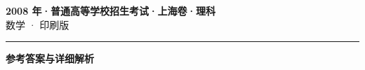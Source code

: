 \documentclass[zihao=5, a4paper]{ctexart}
\begin{document}
\begin{center}
  {\Large\bfseries 2008 年·普通高等学校招生考试·上海卷·理科}\\[4pt]
  {\large 数学 · 印刷版}
\end{center}
\medskip
{}

\par\bigskip\hrule\bigskip
{}
\begin{center}{\large\bfseries 参考答案与详细解析}\end{center}
\smallskip

\end{document}
